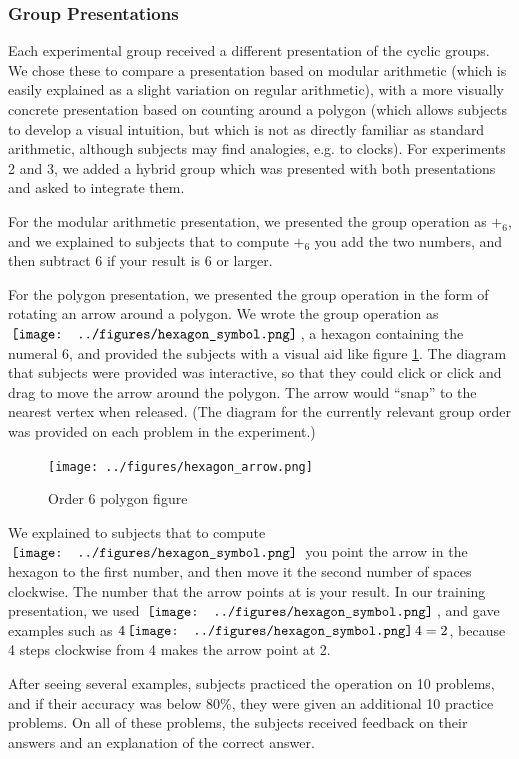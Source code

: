 \documentclass[man,10pt]{apa6}
\newcommand{\hex}{\,\vcenter{\hbox{\texttt{[image: ../figures/hexagon\_symbol.png]}}}\,}
\begin{document}
\subsubsection{Group Presentations}
Each experimental group received a different presentation of the cyclic groups. We chose these to compare a presentation based on modular arithmetic (which is easily explained as a slight variation on regular arithmetic), with a more visually concrete presentation based on counting around a polygon (which allows subjects to develop a visual intuition, but which is not as directly familiar as standard arithmetic, although subjects may find analogies, e.g. to clocks). For experiments 2 and 3, we added a hybrid group which was presented with both presentations and asked to integrate them. \par 
For the modular arithmetic presentation, we presented the group operation as $+_6$, and we explained to subjects that to compute $+_6$ you add the two numbers, and then subtract $6$ if your result is $6$ or larger.\par
For the polygon presentation, we presented the group operation in the form of rotating an arrow around a polygon. We wrote the group operation as $\hex$, a hexagon containing the numeral $6$, and provided the subjects with a visual aid like figure \ref{hexagonex}. The diagram that subjects were provided was interactive, so that they could click or click and drag to move the arrow around the polygon. The arrow would ``snap'' to the nearest vertex when released. (The diagram for the currently relevant group order was provided on each problem in the experiment.)
\begin{figure} \centering \texttt{[image: ../figures/hexagon\_arrow.png]} \caption{Order 6 polygon figure} \label{hexagonex} \end{figure} \noindent
We explained to subjects that to compute $\hex$ you point the arrow in the hexagon to the first number, and then move it the second number of spaces clockwise. The number that the arrow points at is your result. In our training presentation, we used $\hex$, and gave examples such as $4 \hex 4 = 2$, because 4 steps clockwise from 4 makes the arrow point at 2. \par
After seeing several examples, subjects practiced the operation on 10 problems, and if their accuracy was below 80\%, they were given an additional 10 practice problems. On all of these problems, the subjects received feedback on their answers and an explanation of the correct answer. \par 
\end{document}

